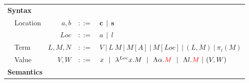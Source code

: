 \documentclass[a4paper]{article}
\theoremstyle{plain}
\theoremstyle{definition}
\newcommand{\ruleverticalsep}{0.5cm}
\newcommand{\client}{\textbf{c}}
\newcommand{\server}{\textbf{s}}
\newcommand{\Loc}{Loc}
\begin{document}
\begin{figure}[h]
\centering
\begin{tabular}{ l  l  r  c  l }
\multicolumn{5}{l}{\textbf{Syntax}} \\
 & Location & $a,b$   & $::=$ & $\client \ \ | \  \  \server$ \\
 &          & $\Loc$  & $::=$  & $a  \ \ |  \ \ l$ \\
 & Term     & $L,M,N$ & $::=$  & $V  \ | \  L \ M  \ | \  M[A]  \ | \  M[\Loc]  \ | \  (L,M)  \ |  \ \pi_i(M)$ \\
 & Value & $V,W$ & $::=$ & $x  \ \ |  \ \ \lambda^{Loc} x.M  \ \ |  \ \ \Lambda\alpha.{\color{red} M}  \ \ |  \ \ \Lambda l.{\color{red} M} \ | \ (V,W)$ \\[\ruleverticalsep]
\multicolumn{5}{l}{\textbf{Semantics}} \\
\end{tabular}


\end{figure}
\end{document}
